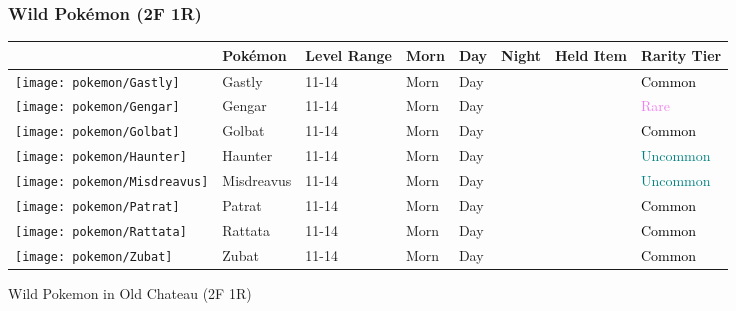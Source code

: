 \subsubsection{Wild Pokémon (2F 1R)}%
\label{ssubsec:WildPokmon(2F1R)}%
\begin{longtable}{||l l l l l l l l||}%
\hline%
&Pokémon&Level Range&Morn&Day&Night&Held Item&Rarity Tier\\%
\hline%
\endhead%
\hline%
\texttt{[image: pokemon/Gastly]}&Gastly&11{-}14&Morn&Day&&&\textcolor{black}{%
Common%
}\\%
\hline%
\texttt{[image: pokemon/Gengar]}&Gengar&11{-}14&Morn&Day&&&\textcolor{violet}{%
Rare%
}\\%
\hline%
\texttt{[image: pokemon/Golbat]}&Golbat&11{-}14&Morn&Day&&&\textcolor{black}{%
Common%
}\\%
\hline%
\texttt{[image: pokemon/Haunter]}&Haunter&11{-}14&Morn&Day&&&\textcolor{teal}{%
Uncommon%
}\\%
\hline%
\texttt{[image: pokemon/Misdreavus]}&Misdreavus&11{-}14&Morn&Day&&&\textcolor{teal}{%
Uncommon%
}\\%
\hline%
\texttt{[image: pokemon/Patrat]}&Patrat&11{-}14&Morn&Day&&&\textcolor{black}{%
Common%
}\\%
\hline%
\texttt{[image: pokemon/Rattata]}&Rattata&11{-}14&Morn&Day&&&\textcolor{black}{%
Common%
}\\%
\hline%
\texttt{[image: pokemon/Zubat]}&Zubat&11{-}14&Morn&Day&&&\textcolor{black}{%
Common%
}\\%
\hline%
\end{longtable}%
\caption{Wild Pokemon in Old Chateau (2F 1R)}